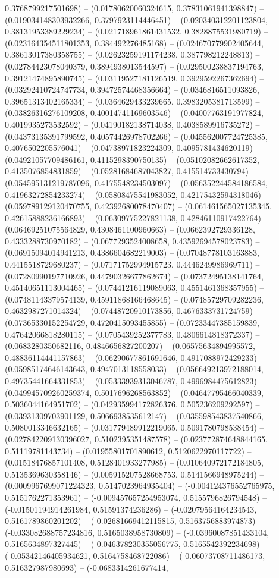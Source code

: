 0.3768799217501698) -- (0.01780620060324615, 0.37831061941398847) -- (0.019034148303932266, 0.3797923114446451) -- (0.020340312201123804, 0.38131953389229234) -- (0.021718961861431532, 0.3828875531980719) -- (0.023164354511801353, 0.384492276485168) -- (0.024670779902405644, 0.38613017380358755) -- (0.02623259191174238, 0.387798212248813) -- (0.02784423078040379, 0.3894938013544597) -- (0.029500238837194763, 0.39121474895890745) -- (0.03119527181126519, 0.3929592267362694) -- (0.03292410724747734, 0.39472574468356664) -- (0.0346816511093826, 0.39651313402165334) -- (0.0364629433239665, 0.3983205381713599) -- (0.03826316276109208, 0.40014741169603546) -- (0.04007763191977824, 0.4019935273532592) -- (0.04190182138714038, 0.4038589916735272) -- (0.04373135391799592, 0.40574426978702266) -- (0.045562007724725385, 0.4076502205576041) -- (0.04738971823224309, 0.4095781434620119) -- (0.04921057709486161, 0.4115298390750135) -- (0.05102082662617352, 0.4135076854831859) -- (0.05281684687043827, 0.415514733430794) -- (0.054595131219787096, 0.4175548234503097) -- (0.056352244584186584, 0.41963272854233274) -- (0.05808475541983052, 0.42175432594318046) -- (0.059789129120470755, 0.42392680078470407) -- (0.061461565027135345, 0.42615888236166893) -- (0.06309775227821138, 0.42846110917422764) -- (0.06469251075564829, 0.4308461100960663) -- (0.0662392729336128, 0.4333288730970182) -- (0.0677293524008658, 0.43592694578023783) -- (0.06915094014941213, 0.4386604682219003) -- (0.07048778103163883, 0.4415518729680237) -- (0.07171752994915723, 0.4446249986969711) -- (0.07280990197710926, 0.44790326677862674) -- (0.07372495138141764, 0.45140651113004465) -- (0.07441216119089063, 0.4551461368357955) -- (0.07481143379574139, 0.45911868166468645) -- (0.07485729709282236, 0.4632987271014324) -- (0.07448720910173856, 0.4676333731724759) -- (0.07365330152254729, 0.4720415093455855) -- (0.07233447385159839, 0.47642066818280115) -- (0.0705439252377783, 0.4806614818372337) -- (0.0683280350682116, 0.4846656827200207) -- (0.06575634894995572, 0.48836114441157863) -- (0.06290677861691646, 0.4917088972429233) -- (0.05985174646143643, 0.4947013118558033) -- (0.056649213972188014, 0.49735441664331853) -- (0.05333939313046787, 0.4996984475612823) -- (0.049945709260259374, 0.5017696268563852) -- (0.04647795466040339, 0.5036044164951702) -- (0.042935994172826376, 0.505236209292597) -- (0.03931309703901129, 0.5066938535612147) -- (0.035598543837540866, 0.5080013346632165) -- (0.031779489912219065, 0.5091780798538454) -- (0.027842209130396027, 0.5102395351487578) -- (0.023772874648844165, 0.51119781143734) -- (0.01955801701890612, 0.5120622970117722) -- (0.01518476857101408, 0.5128401933277985) -- (0.010640972172184805, 0.5135369630358146) -- (0.005915207528668753, 0.5141566948975244) -- (0.0009967699071224323, 0.5147023964935404) -- (-0.004124376552765975, 0.5151762271353961) -- (-0.009457657254953074, 0.5155796826794548) -- (-0.01501194914261984, 0.51591374236286) -- (-0.02079564164234543, 0.5161789860201202) -- (-0.02681669412115815, 0.5163756883974873) -- (-0.033082688757234816, 0.5165038958730809) -- (-0.03960087851433104, 0.5165634897327445) -- (-0.046378230355056775, 0.5165542392234698) -- (-0.05342146405934621, 0.5164758468722086) -- (-0.06073708711486173, 0.516327987980693) -- (-0.0683314261677414, 